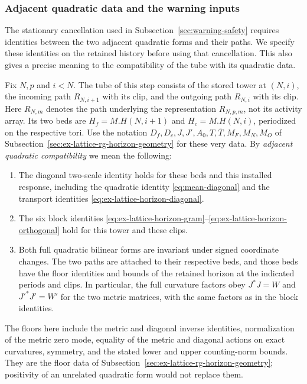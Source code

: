 \subsubsection{Adjacent quadratic data and the warning inputs}
\label{sec:selected-local-warnings}

The stationary cancellation used in Subsection~\ref{sec:warning-safety}
requires identities between the two adjacent quadratic forms and their
paths. We specify these identities on the retained history before using
that cancellation. This also gives a precise meaning to the compatibility
of the tube with its quadratic data.

Fix $N,p$ and $i<N$. The tube of this step consists of the stored tower
at $(N,i)$, the incoming path $R_{N,i+1}$ with its clip, and the outgoing
path $R_{N,i}$ with its clip. Here $R_{N,m}$ denotes the path underlying
the representation $R_{N,p,m}$, not its activity array. Its two beds are
$H_f=M.H(N,i+1)$ and $H_c=M.H(N,i)$, periodized on the respective tori.
Use the notation $D_f,D_c,J,J',A_0,T,\overline T,M_F,M_N,M_O$ of
Subsection~\ref{sec:ex-lattice-rg-horizon-geometry} for these very data.
By \emph{adjacent quadratic compatibility} we mean the following:
\begin{enumerate}
\item The diagonal two-scale identity holds for these beds and this
 installed response, including the quadratic identity
 \eqref{eq:mean-diagonal} and the transport identities
 \eqref{eq:ex-lattice-horizon-diagonal}.
\item The six block identities
 \eqref{eq:ex-lattice-horizon-gram}--\eqref{eq:ex-lattice-horizon-orthogonal}
 hold for this tower and these clips.
\item Both full quadratic bilinear forms are invariant under signed
 coordinate changes. The two paths are attached to their respective
 beds, and those beds have the floor identities and bounds of the
 retained horizon at the indicated periods and clips. In particular,
 the full curvature factors obey $J^*J=W$ and $J'^*J'=W'$ for the
 two metric matrices, with the same factors as in the block identities.
\end{enumerate}
The floors here include the metric and diagonal inverse identities,
normalization of the metric zero mode, equality of the metric and
 diagonal actions on exact curvatures, symmetry, and the stated lower
and upper counting-norm bounds. They are the floor data of
Subsection~\ref{sec:ex-lattice-rg-horizon-geometry}; positivity of an
unrelated quadratic form would not replace them.

